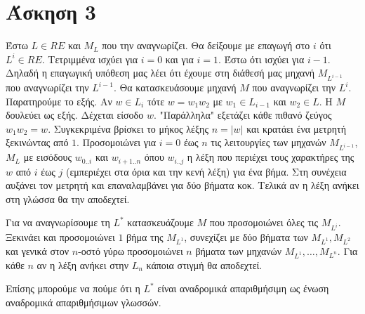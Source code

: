 \documentclass[11pt]{article}
\begin{document}


\section*{Άσκηση 3}
Έστω $L\in RE$ και $M_L$ που την αναγνωρίζει. Θα δείξουμε με επαγωγή στο $i$ ότι $L^i\in RE$. 
Τετριμμένα ισχύει για $i=0$ και για $i=1$. Έστω ότι ισχύει για $i-1$. Δηλαδή η επαγωγική 
υπόθεση μας λέει ότι έχουμε στη διάθεσή μας μηχανή $M_{L^{i-1}}$ που αναγνωρίζει την $L^{i-1}$. Θα κατασκευάσουμε
μηχανή $Μ$ που αναγνωρίζει την $L^i$. Παρατηρούμε το εξής. Αν $w\in L_i$ τότε $w=w_1w_2$ με $w_1\in L_{i-1}$ και
$w_2\in L$. Η $M$ δουλεύει ως εξής. Δέχεται είσοδο $w$. "Παράλληλα" εξετάζει κάθε πιθανό ζεύγος $w_1w_2=w$. Συγκεκριμένα
βρίσκει το μήκος λέξης $n=|w|$ και κρατάει ένα μετρητή ξεκινώντας από $1$. Προσομοιώνει για $i=0$ έως $n$ τις λειτουργίες
των μηχανών $M_{L^{i-1}}$, $M_L$ με εισόδους $w_{0..i}$ και $w_{i+1..n}$ όπου $w_{i..j}$ η λέξη που περιέχει τους
χαρακτήρες της $w$ από $i$ έως $j$ (εμπεριέχει στα όρια και την κενή λέξη) για ένα βήμα. Στη συνέχεια αυξάνει τον μετρητή
και επαναλαμβάνει για δύο βήματα κοκ. Τελικά αν η λέξη ανήκει στη γλώσσα θα την αποδεχτεί.

Για να αναγνωρίσουμε τη $L^*$ κατασκευάζουμε $M$ που προσομοιώνει όλες τις $M_{L^i}$. Ξεκινάει και προσομοιώνει $1$ βήμα
της $M_{L^1}$, συνεχίζει με δύο βήματα των $M_{L^1},M_{L^2}$ και γενικά στον $n$-οστό γύρω προσομοιώνει $n$ βήματα των 
μηχανών $M_{L^1},\ldots,M_{L^n}$. Για κάθε $n$ αν η λέξη ανήκει στην $L_n$ κάποια στιγμή θα αποδεχτεί.

Επίσης μπορούμε να πούμε ότι η $L^*$ είναι αναδρομικά απαριθμήσιμη ως ένωση αναδρομικά απαριθμήσιμων γλωσσών.  



\end{document}
